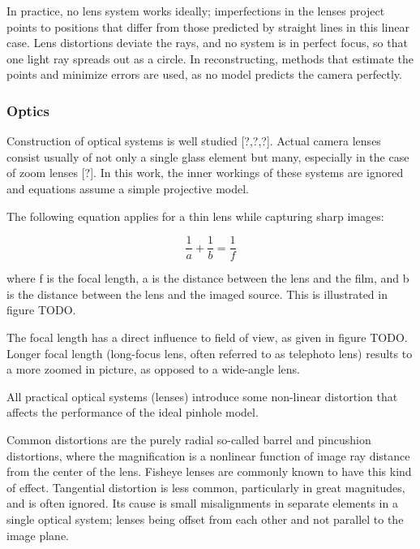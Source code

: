 In practice, no lens system works ideally; imperfections in the lenses project points to positions that differ from those predicted by straight lines in this linear case. Lens distortions deviate the rays, and no system is in perfect focus, so that one light ray spreads out as a circle. In reconstructing, methods that estimate the points and minimize errors are used, as no model predicts the camera perfectly.


\subsubsection{Optics}

Construction of optical systems is well studied [?,?,?]. Actual camera lenses consist usually of not only a single glass element but many, especially in the case of zoom lenses [?]. In this work, the inner workings of these systems are ignored and equations assume a simple projective model.

The following equation applies for a thin lens while capturing sharp images:

\begin{equation}
	\frac{1}{a} + \frac{1}{b} = \frac{1}{f} \label{eq:focal}
\end{equation}

where f is the focal length, a is the distance between the lens and the film, and b is the distance between the lens and the imaged source. This is illustrated in figure TODO.

The focal length has a direct influence to field of view, as given in figure TODO. Longer focal length (long-focus lens, often referred to as telephoto lens) results to a more zoomed in picture, as opposed to a wide-angle lens. 

All practical optical systems (lenses) introduce some non-linear distortion that affects the performance of the ideal pinhole model.

Common distortions are the purely radial so-called barrel and pincushion distortions, where the magnification is a nonlinear function of image ray distance from the center of the lens.
Fisheye lenses are commonly known to have this kind of effect.
Tangential distortion is less common, particularly in great magnitudes, and is often ignored. Its cause is small misalignments in separate elements in a single optical system; lenses being offset from each other and not parallel to the image plane.

